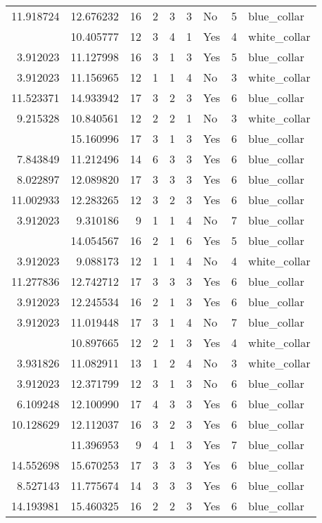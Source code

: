 \documentclass[
]{article}
\begin{document}
\begin{longtable}[t]{rrrrrllrl}
11.918724 & 12.676232 & 16 & 2 & 3 & 3 & No & 5 & blue\_collar\\
\addlinespace
6.866933 & 10.405777 & 12 & 3 & 4 & 1 & Yes & 4 & white\_collar\\
3.912023 & 11.127998 & 16 & 3 & 1 & 3 & Yes & 5 & blue\_collar\\
3.912023 & 11.156965 & 12 & 1 & 1 & 4 & No & 3 & white\_collar\\
11.523371 & 14.933942 & 17 & 3 & 2 & 3 & Yes & 6 & blue\_collar\\
9.215328 & 10.840561 & 12 & 2 & 2 & 1 & No & 3 & white\_collar\\
\addlinespace
3.912023 & 15.160996 & 17 & 3 & 1 & 3 & Yes & 6 & blue\_collar\\
7.843849 & 11.212496 & 14 & 6 & 3 & 3 & Yes & 6 & blue\_collar\\
8.022897 & 12.089820 & 17 & 3 & 3 & 3 & Yes & 6 & blue\_collar\\
11.002933 & 12.283265 & 12 & 3 & 2 & 3 & Yes & 6 & blue\_collar\\
3.912023 & 9.310186 & 9 & 1 & 1 & 4 & No & 7 & blue\_collar\\
\addlinespace
3.912023 & 14.054567 & 16 & 2 & 1 & 6 & Yes & 5 & blue\_collar\\
3.912023 & 9.088173 & 12 & 1 & 1 & 4 & No & 4 & white\_collar\\
11.277836 & 12.742712 & 17 & 3 & 3 & 3 & Yes & 6 & blue\_collar\\
3.912023 & 12.245534 & 16 & 2 & 1 & 3 & Yes & 6 & blue\_collar\\
3.912023 & 11.019448 & 17 & 3 & 1 & 4 & No & 7 & blue\_collar\\
\addlinespace
3.912023 & 10.897665 & 12 & 2 & 1 & 3 & Yes & 4 & white\_collar\\
3.931826 & 11.082911 & 13 & 1 & 2 & 4 & No & 3 & white\_collar\\
3.912023 & 12.371799 & 12 & 3 & 1 & 3 & No & 6 & blue\_collar\\
6.109248 & 12.100990 & 17 & 4 & 3 & 3 & Yes & 6 & blue\_collar\\
10.128629 & 12.112037 & 16 & 3 & 2 & 3 & Yes & 6 & blue\_collar\\
\addlinespace
3.912023 & 11.396953 & 9 & 4 & 1 & 3 & Yes & 7 & blue\_collar\\
14.552698 & 15.670253 & 17 & 3 & 3 & 3 & Yes & 6 & blue\_collar\\
8.527143 & 11.775674 & 14 & 3 & 3 & 3 & Yes & 6 & blue\_collar\\
14.193981 & 15.460325 & 16 & 2 & 2 & 3 & Yes & 6 & blue\_collar\\

\end{longtable}
\end{document}
